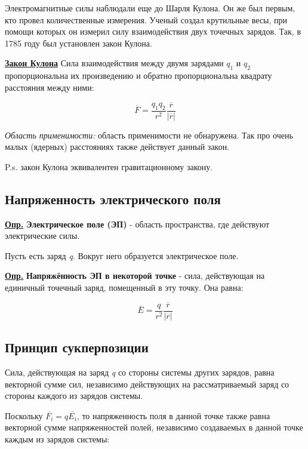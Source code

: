 Электромагнитные силы наблюдали еще до Шарля Кулона. Он же был первым, кто провел количественные измерения. Ученый создал крутильные весы, при помощи которых он измерил силу взаимодействия двух точечных зарядов. Так, в 1785 году был установлен закон Кулона.

\colorbox{faded}{\underline{\textbf{Закон Кулона}}} Сила взаимодействия между двумя зарядами $q_{1}$ и $q_{2}$ пропорциональна их произведению и обратно пропорциональна квадрату расстояния между ними: 

\begin{equation}\label{opr1}
\overline{F} = \frac{q_{1} q_{2}}{r^2} \frac{\overline{r}}{|\overline{r}|}
\end{equation}

\textit{Область применимости:} область применимости не обнаружена. Так про очень малых (ядерных) расстояниях также действует данный закон.

P.s. закон Кулона эквивалентен гравитационному закону.

\subsection{Напряженность электрического поля}

\colorbox{faded}{\underline{\textbf{Опр.}}} \textbf{Электрическое поле (ЭП)} - область пространства, где действуют электрические силы.

Пусть есть заряд \textit{q}. Вокруг него образуется электрическое поле. 

\colorbox{faded}{\underline{\textbf{Опр.}}} \textbf{Напряжённость ЭП в некоторой точке} - сила, действующая на единичный точечный заряд, помещенный в эту точку. Она равна:

\begin{equation}\label{opr2}
\overline{E} = \frac{q}{r^2} \frac{\overline{r}}{|\overline{r}|}
\end{equation}

\subsection{Принцип сукперпозиции}

Сила, действующая на заряд \textit{q} со стороны системы других зарядов, равна векторной сумме сил, независимо действующих на рассматриваемый заряд со стороны каждого из зарядов системы.

Поскольку $\overline{F_{i}} = q \overline{E_{i}}$, то напряженность поля в данной точке также равна векторной сумме напряженностей полей, независимо создаваемых в данной точке каждым из зарядов системы:

